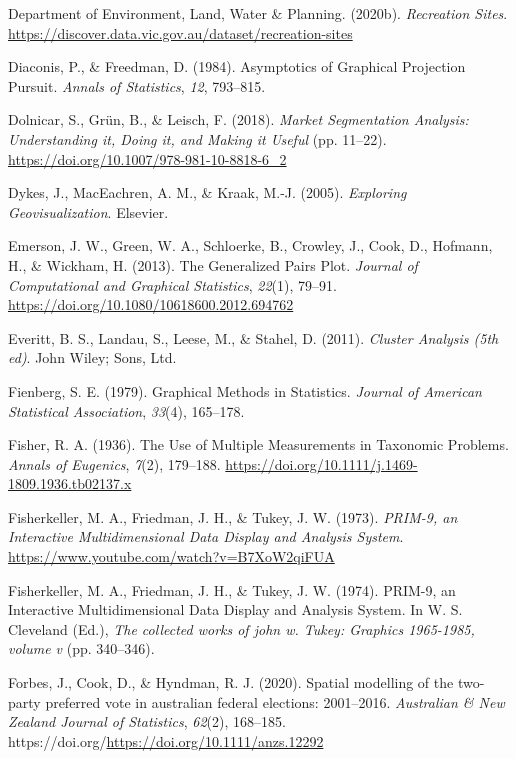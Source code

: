 \documentclass[
  letterpaper,
]{krantz}
\newlength{\cslhangindent}
\newenvironment{CSLReferences}[2] %
 {\begin{list}{}{%
  \setlength{\itemindent}{0pt}
  \setlength{\leftmargin}{0pt}
  \setlength{\parsep}{0pt}
  \ifodd #1
   \setlength{\leftmargin}{\cslhangindent}
   \setlength{\itemindent}{-1\cslhangindent}
  \fi
  \setlength{\itemsep}{#2\baselineskip}}}
 {\end{list}}
\begin{document}
\begin{CSLReferences}{1}{0}
Department of Environment, Land, Water \& Planning. (2020b).
\emph{{Recreation Sites}}.
\url{https://discover.data.vic.gov.au/dataset/recreation-sites}

Diaconis, P., \& Freedman, D. (1984). {A}symptotics of {G}raphical
{P}rojection {P}ursuit. \emph{Annals of Statistics}, \emph{12},
793--815.

Dolnicar, S., Grün, B., \& Leisch, F. (2018). \emph{Market
{S}egmentation {A}nalysis: {U}nderstanding it, {D}oing it, and {M}aking
it {U}seful} (pp. 11--22).
\url{https://doi.org/10.1007/978-981-10-8818-6_2}

Dykes, J., MacEachren, A. M., \& Kraak, M.-J. (2005). \emph{Exploring
{G}eovisualization}. Elsevier.

Emerson, J. W., Green, W. A., Schloerke, B., Crowley, J., Cook, D.,
Hofmann, H., \& Wickham, H. (2013). The {G}eneralized {P}airs {P}lot.
\emph{Journal of Computational and Graphical Statistics}, \emph{22}(1),
79--91. \url{https://doi.org/10.1080/10618600.2012.694762}

Everitt, B. S., Landau, S., Leese, M., \& Stahel, D. (2011).
\emph{Cluster {A}nalysis (5th ed)}. John Wiley; Sons, Ltd.

Fienberg, S. E. (1979). Graphical {M}ethods in {S}tatistics.
\emph{Journal of American Statistical Association}, \emph{33}(4),
165--178.

Fisher, R. A. (1936). The {U}se of {M}ultiple {M}easurements in
{T}axonomic {P}roblems. \emph{Annals of Eugenics}, \emph{7}(2),
179--188. \url{https://doi.org/10.1111/j.1469-1809.1936.tb02137.x}

Fisherkeller, M. A., Friedman, J. H., \& Tukey, J. W. (1973).
\emph{{PRIM-9}, an {I}nteractive {M}ultidimensional {D}ata {D}isplay and
{A}nalysis {S}ystem}. \url{https://www.youtube.com/watch?v=B7XoW2qiFUA}

Fisherkeller, M. A., Friedman, J. H., \& Tukey, J. W. (1974). {PRIM-9},
an {I}nteractive {M}ultidimensional {D}ata {D}isplay and {A}nalysis
{S}ystem. In W. S. Cleveland (Ed.), \emph{The collected works of john w.
Tukey: Graphics 1965-1985, volume v} (pp. 340--346).

Forbes, J., Cook, D., \& Hyndman, R. J. (2020). Spatial modelling of the
two-party preferred vote in australian federal elections: 2001--2016.
\emph{Australian \& New Zealand Journal of Statistics}, \emph{62}(2),
168--185. https://doi.org/\url{https://doi.org/10.1111/anzs.12292}


\end{CSLReferences}
\end{document}
